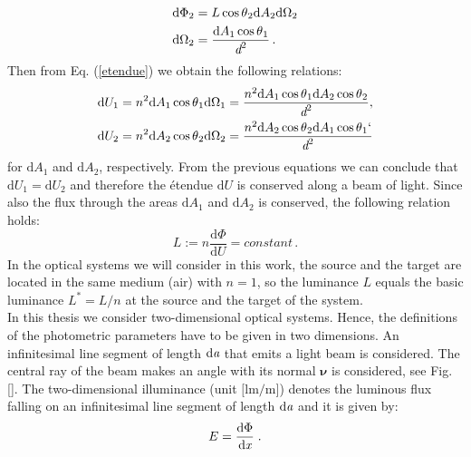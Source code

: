 \begin{equation}\begin{split}
\textrm{d}\Phi_2 &= L \cos\mbox{$\theta$}_2 \textrm{d}A_2 \textrm{d}\Omega_2\\
\textrm{d}\Omega_2 &= \frac{\textrm{d}A_1\cos\mbox{$\theta$}_1}{\textit{d}^2}\,.
\end{split}
\end{equation}
Then from Eq. (\ref{etendue}) we obtain the following relations: \begin{equation}
\begin{split}
\textrm{d}U_1 &= n^2 \textrm{d}A_1\cos\mbox{$\theta$}_1\textrm{d}\Omega_1= \frac{n^2 \textrm{d}A_1\cos\mbox{$\theta$}_1\textrm{d}A_2\cos\mbox{$\theta$}_2}{\textit{d}^2},\\
\textrm{d}U_2 &= n^2 \textrm{d}A_2\cos\mbox{$\theta$}_2\textrm{d}\Omega_2= \frac{ n^2 \textrm{d}A_2\cos\mbox{$\theta$}_2\textrm{d}A_1\cos\mbox{$\theta$}_1	`}{\textit{d}^2}
\end{split}
\end{equation}
for $\textrm{d}A_1$ and $\textrm{d}A_2$, respectively.
From the previous equations we can conclude that $\textrm{d}U_1=\textrm{d}U_2$ and therefore the \'{e}tendue $\textrm{d}U$ is conserved along a beam of light. 
Since also the flux through the areas $\textrm{d}A_1$ and $\textrm{d}A_2$ is conserved, the following relation holds:
\begin{equation}\label{basicluminance}
L := n \frac{\textrm{d}\Phi}{\textrm{d}U} = constant\,.
\end{equation}
 In the optical systems we will consider in this work, the source and the target are located in the same medium (air) with $n=1$, so the luminance $L$ equals the basic luminance $L^* = L/n$ at the source and the target of the system.\\
\indent In this thesis we consider two-dimensional optical systems. 
 Hence, the definitions of the photometric parameters have to be given in two dimensions. An infinitesimal line segment of length $\textrm{d}\textit{a}$ that emits a light beam is considered. The central ray of the beam makes an angle \myangle with its normal $\boldsymbol{\nu}$ is considered, see Fig. \ref{}. 
 The two-dimensional illuminance \big(unit $\big[\textrm{lm}/\textrm{m}\big]$\big) denotes the luminous flux falling on an infinitesimal line segment of length $\textrm{d}\textit{a}$ 
and it is given by:
 \begin{equation}
 E=\frac{\textrm{d}\Phi}{\textrm{d}\textit{x}}\;.
 \end{equation}
